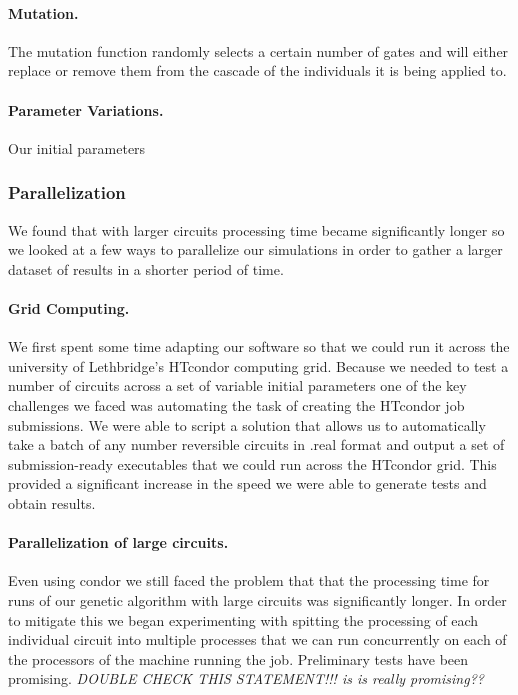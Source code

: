 \paragraph{Mutation.}

The mutation function randomly selects a certain number of gates and will either replace or remove them from the cascade of the 
individuals it is being applied to.

\paragraph{Parameter Variations.}

Our initial parameters


\subsubsection{Parallelization}

We found that with larger circuits processing time became significantly longer so we looked at a few ways to parallelize our simulations 
in order to gather a larger dataset of results in a shorter period of time.

\paragraph{Grid Computing.}

We first spent some time adapting our software so that we could run it across the university of Lethbridge's HTcondor computing grid. 
Because we needed to test a number of circuits across a set of variable initial parameters one of the key challenges we faced was 
automating the task of creating the HTcondor job submissions. We were able to script a solution that allows us to automatically take 
a batch of any number reversible circuits in .real format and output a set of submission-ready executables that we could run across 
the HTcondor grid. This provided a significant increase in the speed we were able to generate tests and obtain results.

\paragraph{Parallelization of large circuits.}

Even using condor we still faced the problem that that the processing time for runs of our genetic algorithm with large circuits was 
significantly longer. In order to mitigate this we began experimenting with spitting the processing of each individual circuit into 
multiple processes that we can run concurrently on each of the processors of the machine running the job. Preliminary tests have been 
promising.   \emph{  DOUBLE CHECK THIS STATEMENT!!! is is really promising??}